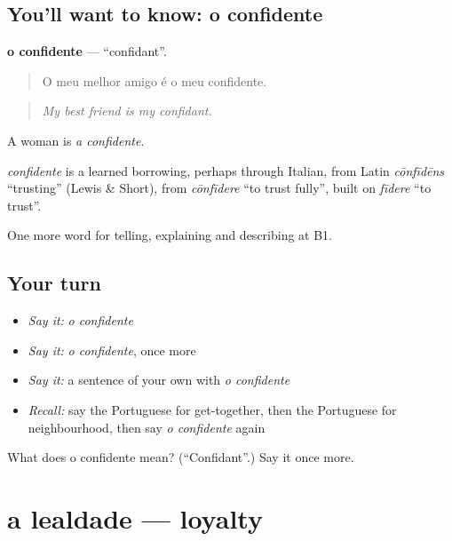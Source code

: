 \subsection*{You'll want to know: o confidente}
\textbf{o confidente} — \textquotedblleft{}confidant\textquotedblright{}.

\begin{quote}
O meu melhor amigo é o meu confidente.
\end{quote}

\begin{quote}
\emph{My best friend is my confidant.}
\end{quote}

A woman is \emph{a confidente}.

\begin{cousinweb}
\emph{confidente} is a learned borrowing, perhaps through Italian, from Latin \emph{cōnfīdēns} \textquotedblleft{}trusting\textquotedblright{} (Lewis \& Short), from \emph{cōnfīdere} \textquotedblleft{}to trust fully\textquotedblright{}, built on \emph{fīdere} \textquotedblleft{}to trust\textquotedblright{}.
\end{cousinweb}

\begin{grammarlens}[title={What you've built}]
One more word for telling, explaining and describing at B1.
\end{grammarlens}

\subsection*{Your turn}
\begin{itemize}
\raggedright
  \item \emph{Say it:} \emph{o confidente}
  \item \emph{Say it:} \emph{o confidente}, once more
  \item \emph{Say it:} a sentence of your own with \emph{o confidente}
  \item \emph{Recall:} say the Portuguese for get-together, then the Portuguese for neighbourhood, then say \emph{o confidente} again
\end{itemize}

\begin{tcolorbox}[breakable,colback=teal!4,colframe=teal!35!black,title={Before you move on}]
What does o confidente mean? (\textquotedblleft{}Confidant\textquotedblright{}.) Say it once more.
\end{tcolorbox}
\section[a lealdade]{a lealdade — loyalty}

